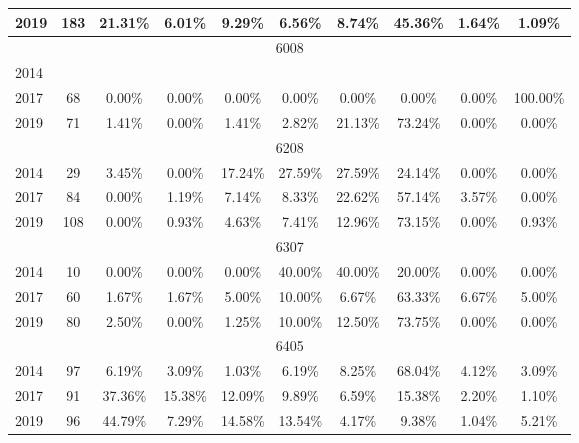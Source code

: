 \begin{table}[H]
\begin{tabular}{|l|c|ccc|ccc|cc|}
2019 & 183 & 21.31\% & 6.01\% & 9.29\% & 6.56\% & 8.74\% & 45.36\% & 1.64\% & 1.09\%\\
\hline
\hline
\multicolumn{10}{|c|}{6008}\\
\hline
2014 & & & & & & & & & \\
2017 & 68 & 0.00\% & 0.00\% & 0.00\% & 0.00\% & 0.00\% & 0.00\% & 0.00\% & 100.00\%\\
2019 & 71 & 1.41\% & 0.00\% & 1.41\% & 2.82\% & 21.13\% & 73.24\% & 0.00\% & 0.00\%\\
\hline
\hline
\multicolumn{10}{|c|}{6208}\\
\hline
2014 & 29 & 3.45\% & 0.00\% & 17.24\% & 27.59\% & 27.59\% & 24.14\% & 0.00\% & 0.00\%\\
2017 & 84 & 0.00\% & 1.19\% & 7.14\% & 8.33\% & 22.62\% & 57.14\% & 3.57\% & 0.00\%\\
2019 & 108 & 0.00\% & 0.93\% & 4.63\% & 7.41\% & 12.96\% & 73.15\% & 0.00\% & 0.93\%\\
\hline
\hline
\multicolumn{10}{|c|}{6307}\\
\hline
2014 & 10 & 0.00\% & 0.00\% & 0.00\% & 40.00\% & 40.00\% & 20.00\% & 0.00\% & 0.00\%\\
2017 & 60 & 1.67\% & 1.67\% & 5.00\% & 10.00\% & 6.67\% & 63.33\% & 6.67\% & 5.00\%\\
2019 & 80 & 2.50\% & 0.00\% & 1.25\% & 10.00\% & 12.50\% & 73.75\% & 0.00\% & 0.00\%\\
\hline
\hline
\multicolumn{10}{|c|}{6405}\\
\hline
2014 & 97 & 6.19\% & 3.09\% & 1.03\% & 6.19\% & 8.25\% & 68.04\% & 4.12\% & 3.09\%\\
2017 & 91 & 37.36\% & 15.38\% & 12.09\% & 9.89\% & 6.59\% & 15.38\% & 2.20\% & 1.10\%\\
2019 & 96 & 44.79\% & 7.29\% & 14.58\% & 13.54\% & 4.17\% & 9.38\% & 1.04\% & 5.21\%\\
\hline
\bottomrule
\end{tabular}
\end{table}
